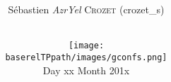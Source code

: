 \documentclass[12pt,a4paper]{report}
\begin{document}
\title{
  \vspace{1cm}
  \textbf{\Huge{\Tp{} \workshoptitle}}\\
}
\author{
  \Large{Sébastien \textit{AzrYel} \textsc{Crozet} ({\ttfamily crozet\_s})}\\\\
}

\date{
  \vspace{1cm}
  \texttt{[image: \\baserelTPpath/images/gconfs.png]}\\
  \vspace{0.5cm}
  Day xx Month 201x
}
\maketitle
\newpage
\tableofcontents
\newpage



\end{document}
